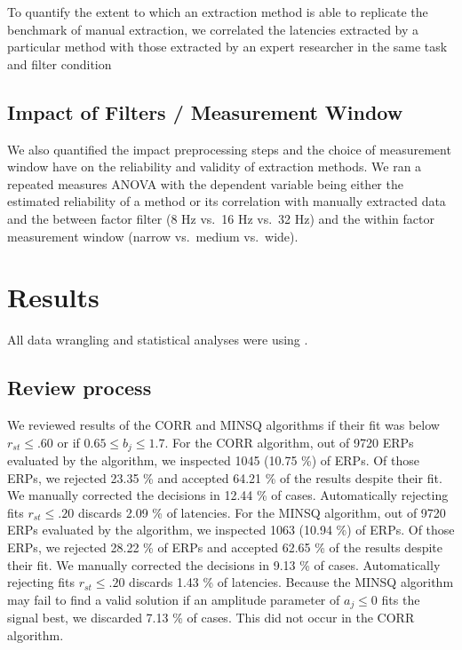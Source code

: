 \documentclass[
  man,floatsintext]{apa7}
\begin{document}
To quantify the extent to which an extraction method is able to replicate the benchmark of manual extraction, we correlated the latencies extracted by a particular method with those extracted by an expert researcher in the same task and filter condition

\hypertarget{impact-of-filters-measurement-window}{%
\subsection{Impact of Filters / Measurement Window}\label{impact-of-filters-measurement-window}}

We also quantified the impact preprocessing steps and the choice of measurement window have on the reliability and validity of extraction methods. We ran a repeated measures ANOVA with the dependent variable being either the estimated reliability of a method or its correlation with manually extracted data and the between factor filter (8 Hz vs.~16 Hz vs.~32 Hz) and the within factor measurement window (narrow vs.~medium vs.~wide).

\hypertarget{results}{%
\section{Results}\label{results}}

All data wrangling and statistical analyses were using .

\hypertarget{review-process}{%
\subsection{Review process}\label{review-process}}

We reviewed results of the CORR and MINSQ algorithms if their fit was below \(r_{st} \le .60\) or if \(0.65 \le b_j \le 1.7\). For the CORR algorithm, out of 9720 ERPs evaluated by the algorithm, we inspected 1045 (10.75 \%) of ERPs. Of those ERPs, we rejected 23.35 \% and accepted 64.21 \% of the results despite their fit. We manually corrected the decisions in 12.44 \% of cases. Automatically rejecting fits \(r_{st} \le .20\) discards 2.09 \% of latencies. For the MINSQ algorithm, out of 9720 ERPs evaluated by the algorithm, we inspected 1063 (10.94 \%) of ERPs. Of those ERPs, we rejected 28.22 \% of ERPs and accepted 62.65 \% of the results despite their fit. We manually corrected the decisions in 9.13 \% of cases. Automatically rejecting fits \(r_{st} \le .20\) discards 1.43 \% of latencies. Because the MINSQ algorithm may fail to find a valid solution if an amplitude parameter of \(a_j \le 0\) fits the signal best, we discarded 7.13 \% of cases. This did not occur in the CORR algorithm.
\end{document}
